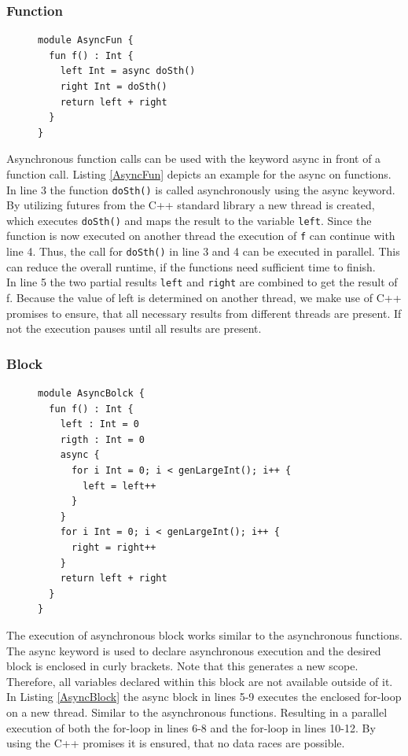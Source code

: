 \subsubsection{Function}
\begin{figure}[h]
\begin{lstlisting}[caption={Example for the async feature on functions.},label={AsyncFun}]
module AsyncFun {
  fun f() : Int {
    left Int = async doSth()
    right Int = doSth()
    return left + right 
  }
}

\end{lstlisting}
\end{figure}
Asynchronous function calls can be used with the keyword async in front of a function call. Listing \ref{AsyncFun} depicts an example for the async on functions. In line 3 the function \texttt{doSth()} is called asynchronously using the async keyword. By utilizing futures from the C++ standard library a new thread is created, which executes \texttt{doSth()} and maps the result to the variable \texttt{left}. Since the function is now executed on another thread the execution of \texttt{f} can continue with line 4. Thus, the call for \texttt{doSth()} in line 3 and 4 can be executed in parallel. This can reduce the overall runtime, if the functions need sufficient time to finish.\\
In line 5 the two partial results \texttt{left} and \texttt{right} are combined to get the result of f. Because the value of left is determined on another thread, we make use of C++ promises to ensure, that all necessary results from different threads are present. If not the execution pauses until all results are present.\\
\subsubsection{Block}
\begin{figure}[h]
\begin{lstlisting}[caption={Example for the async feature on a set of statements (block).},label={AsyncBlock}]
module AsyncBolck {
  fun f() : Int {
    left : Int = 0
    rigth : Int = 0
    async { 
      for i Int = 0; i < genLargeInt(); i++ {
        left = left++ 
      }
    }
    for i Int = 0; i < genLargeInt(); i++ {
      right = right++ 
    }
    return left + right 
  }
}
\end{lstlisting}
\end{figure}
The execution of asynchronous block works similar to the asynchronous functions. The async keyword is used to declare asynchronous execution and the desired block is enclosed in curly brackets. Note that this generates a new scope. Therefore, all variables declared within this block are not available outside of it.\\
In Listing \ref{AsyncBlock} the async block in lines 5-9 executes the enclosed for-loop on a new thread. Similar to the asynchronous functions. Resulting in a parallel execution of both the for-loop in lines 6-8 and the for-loop in lines 10-12. By using the C++ promises it is ensured, that no data races are possible.
